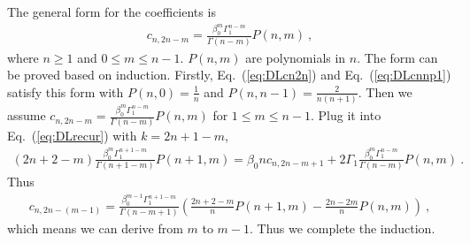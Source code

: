 \documentclass[a4paper,11pt]{article}
\begin{document}
The general form for the coefficients is 
\begin{align}
c_{n,2n-m} = \frac{\beta_0^m \Gamma_1^{n-m}}{\Gamma(n-m)} P(n,m) \ ,
\end{align}
where $n \geq 1$ and $0 \leq m \leq n-1$. $P(n,m)$ are polynomials in $n$. The form can be proved based on induction. Firstly, Eq.~(\ref{eq:DLcn2n}) and Eq.~(\ref{eq:DLcnnp1}) satisfy this form with $P(n,0) = \frac{1}{n}$ and $P(n,n-1) = \frac{2}{n(n+1)}$. Then we assume $c_{n,2n-m} = \frac{\beta_0^m \Gamma_1^{n-m}}{\Gamma(n-m)} P(n,m)$ for $1 \leq m \leq n-1$. Plug it into Eq.~(\ref{eq:DLrecur}) with $k=2n+1-m$,
\begin{align}
(2n+2-m) \frac{\beta_0^m \Gamma_1^{n+1-m}}{\Gamma(n+1-m)} P(n+1,m) = \beta_0 n c_{n,2n-m+1} + 2 \Gamma _1 \frac{\beta_0^m \Gamma_1^{n-m}}{\Gamma(n-m)} P(n,m) \ .
\end{align}
Thus 
\begin{align}\label{eq:DLcmm1}
c_{n,2n-(m-1)} = \frac{\beta_0^{m-1} \Gamma_1^{n+1-m}}{\Gamma(n-m+1)} \left( \frac{2n+2-m}{n} P(n+1,m) - \frac{2n-2m}{n} P(n,m) \right) \ ,
\end{align}
which means we can derive from $m$ to $m-1$. Thus we complete the induction. 
\end{document}
